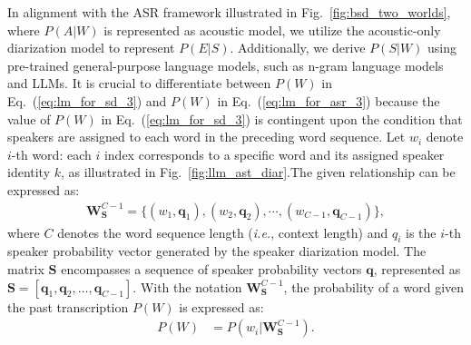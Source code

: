 \documentclass{article}
\begin{document}
In alignment with the ASR framework illustrated in Fig.~\ref{fig:bsd_two_worlds}, where $P(A|W)$ is represented as acoustic model, we utilize the acoustic-only diarization model to represent $P(E|S)$. Additionally, we derive $P(S|W)$ using pre-trained general-purpose language models, such as n-gram language models and LLMs.
It is crucial to differentiate between $P(W)$ in Eq.~(\ref{eq:lm_for_sd_3}) and $P(W)$ in Eq.~(\ref{eq:lm_for_asr_3}) because  the value of $P(W)$ in Eq.~(\ref{eq:lm_for_sd_3}) is contingent upon the condition that speakers are assigned to each word in the preceding word sequence. Let $w_i$ denote $i$-th word: each $i$ index corresponds to a specific word and its assigned speaker identity $k$, as illustrated in Fig.~\ref{fig:llm_ast_diar}.\;The given relationship can be expressed as:
\begin{align}
\mathbf{W}_{\mathbf{S}}^{C-1} = \{(w_{1}, \mathbf{q}_1),(w_{2}, \mathbf{q}_2), \cdots, (w_{C-1}, \mathbf{q}_{C-1})  \},
\label{eq:context_W_c}
\end{align}
where $C$ denotes the word sequence length (\textit{i.e.}, context length) and $q_i$ is the $i$-th speaker probability vector generated by the speaker diarization model. The matrix $\mathbf{S}$ encompasses a sequence of speaker probability vectors $\mathbf{q}$, represented as $\mathbf{S} = [\mathbf{q}_1, \mathbf{q}_2, \ldots, \mathbf{q}_{C-1}]$. With the notation $\mathbf{W}_{\mathbf{S}}^{C-1}$, the probability of a word given the past transcription $P(W)$ is expressed as:
\begin{align}
P(W) &= P(w_i|\textbf{W}_{\textbf{S}}^{C-1}).
\label{eq:p_w_def}
\end{align}
\end{document}
